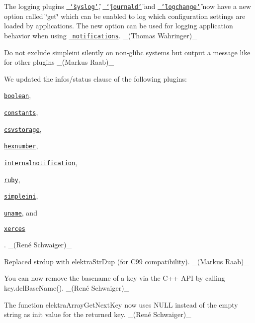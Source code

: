 \begin{DoxyItemize}
\item The logging plugins \href{https://www.libelektra.org/plugins/syslog}{\texttt{ \char`\"{}syslog\char`\"{}}}, \href{https://www.libelektra.org/plugins/journald}{\texttt{ \char`\"{}journald\char`\"{}}} and \href{https://www.libelektra.org/plugins/logchange}{\texttt{ \char`\"{}logchange\char`\"{}}} now have a new option called \char`\"{}get\char`\"{} which can be enabled to log which configuration settings are loaded by applications. The new option can be used for logging application behavior when using \href{https://www.libelektra.org/tutorials/notifications}{\texttt{ notifications}}. \+\_\+(\+Thomas Wahringer)\+\_\+
\item Do not exclude {\ttfamily simpleini} silently on non-\/glibc systems but output a message like for other plugins \+\_\+(\+Markus Raab)\+\_\+
\item We updated the {\ttfamily infos/status} clause of the following plugins\+:
\begin{DoxyItemize}
\item \href{http://libelektra.org/plugins/boolean}{\texttt{ {\ttfamily boolean}}},
\item \href{http://libelektra.org/plugins/constants}{\texttt{ {\ttfamily constants}}},
\item \href{http://libelektra.org/plugins/csvstorage}{\texttt{ {\ttfamily csvstorage}}},
\item \href{http://libelektra.org/plugins/hexnumber}{\texttt{ {\ttfamily hexnumber}}},
\item \href{http://libelektra.org/plugins/internalnotification}{\texttt{ {\ttfamily internalnotification}}},
\item \href{http://libelektra.org/plugins/ruby}{\texttt{ {\ttfamily ruby}}},
\item \href{http://libelektra.org/plugins/simpleini}{\texttt{ {\ttfamily simpleini}}},
\item \href{http://libelektra.org/plugins/uname}{\texttt{ {\ttfamily uname}}}, and
\item \href{http://libelektra.org/plugins/xerces}{\texttt{ {\ttfamily xerces}}}
\end{DoxyItemize}

. \+\_\+(René Schwaiger)\+\_\+
\end{DoxyItemize}


\begin{DoxyItemize}
\item Replaced {\ttfamily strdup} with {\ttfamily elektra\+Str\+Dup} (for C99 compatibility). \+\_\+(\+Markus Raab)\+\_\+
\item You can now remove the basename of a key via the C++ A\+PI by calling {\ttfamily key.\+del\+Base\+Name()}. \+\_\+(René Schwaiger)\+\_\+
\item The function {\ttfamily elektra\+Array\+Get\+Next\+Key} now uses {\ttfamily N\+U\+LL} instead of the empty string as init value for the returned key. \+\_\+(René Schwaiger)\+\_\+
\end{DoxyItemize}


